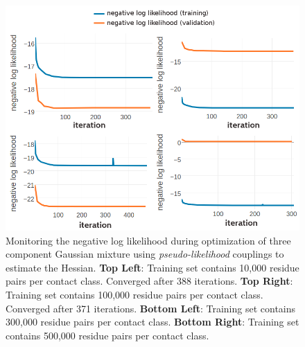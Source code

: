 \documentclass[11pt,a4paper,twoside]{book}
\theoremstyle{definition}
\theoremstyle{definition}
\theoremstyle{remark}
\begin{document}
\begin{figure}
\includegraphics[width=1\linewidth]{img/bayesian_model/pll/3/negLL_combined} \caption{Monitoring the negative log likelihood
during optimization of three component Gaussian mixture using
\emph{pseudo-likelihood} couplings to estimate the Hessian. \textbf{Top
Left}: Training set contains 10,000 residue pairs per contact class.
Converged after 388 iterations. \textbf{Top Right}: Training set
contains 100,000 residue pairs per contact class. Converged after 371
iterations. \textbf{Bottom Left}: Training set contains 300,000 residue
pairs per contact class. \textbf{Bottom Right}: Training set contains
500,000 residue pairs per contact class.}\label{fig:neglogll-pll-3comp}
\end{figure}
\end{document}
